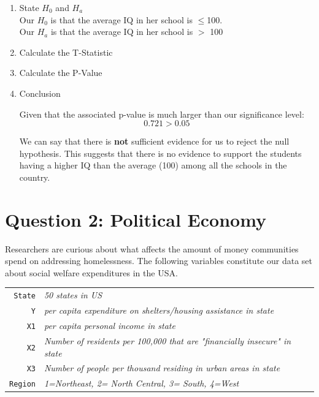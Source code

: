 \documentclass[12pt,letterpaper]{article}
\begin{document}
\begin{enumerate}
\begin{enumerate}[label=(\alph*)]
		
		\item State $H_0$ and $H_a$\\
				
		Our $H_0$ is that the average IQ in her school is $ \leq $100.\\
		
		Our $H_a$ is that the average IQ in her school is $>$ 100\\
		
		

		
		\item Calculate the T-Statistic
	
			  
		
		\item Calculate the P-Value
			  

		\item Conclusion
		
		Given that the associated p-value is much larger than our significance level:
		$$0.721 > 0.05$$
		
		 We can say that there is \textbf{not} sufficient evidence for us to reject the null hypothesis. This suggests that there is no evidence to support the students having a higher IQ than the average (100) among all the schools in the country.
	
		\end{enumerate}
	
	
	
	
	
\end{enumerate}



\newpage

	\section*{Question 2: Political Economy}

\noindent Researchers are curious about what affects the amount of money communities spend on addressing homelessness. The following variables constitute our data set about social welfare expenditures in the USA. \\
\vspace{.5cm}


\begin{tabular}{r|l}
	\texttt{State} &\emph{50 states in US} \\
	\texttt{Y} & \emph{per capita expenditure on shelters/housing assistance in state}\\
	\texttt{X1} &\emph{per capita personal income in state} \\
	\texttt{X2} &  \emph{Number of residents per 100,000 that are "financially insecure" in state}\\
	\texttt{X3} &  \emph{Number of people per thousand residing in urban areas in state} \\
	\texttt{Region} &  \emph{1=Northeast, 2= North Central, 3= South, 4=West} \\
\end{tabular}
\end{document}
